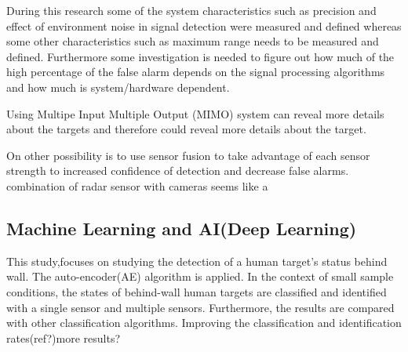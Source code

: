 During this research some of the system characteristics such as precision and effect of environment noise in signal detection were measured and defined whereas some other characteristics such as maximum range needs to be measured and defined. Furthermore some investigation is needed to figure out how much of the high percentage of the false alarm depends on the signal processing algorithms and how much is system/hardware dependent.

Using Multipe Input Multiple Output (MIMO) system can reveal more details about the targets and therefore could reveal more details about the target. 

On other possibility is to use sensor fusion to take advantage of each sensor strength to increased confidence of detection and decrease false alarms. combination of radar sensor with cameras seems like a


\subsection{Machine Learning and AI(Deep Learning)}
This study,focuses on studying the detection of a human
target’s status behind wall. The auto-encoder(AE) algorithm is applied. In the context of small sample conditions, the states of behind-wall human targets
are classified and identified with a single sensor and multiple sensors. Furthermore, the results are compared with
other classification algorithms. Improving the classification and identification rates(ref?)more results?

